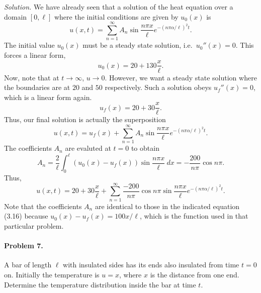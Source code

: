 \documentclass[10pt]{article}
\begin{document}
        \textit{Solution.} We have already seen that a solution of the heat equation over a domain $[0, \ell]$ where the initial conditions
        are given by $u_0(x)$ is
        \[
                u(x, t) = \sum_{n = 1}^\infty A_n \sin\frac{n\pi x}{\ell} e^{-(n\pi \alpha /\ell)^2 t}.
        \]
        The initial value $u_0(x)$ must be a steady state solution, i.e.\ $u_0''(x) = 0$. This forces a linear form,
        \[
                u_0(x) = 20 + 130\frac{x}{\ell}.
        \]
        Now, note that at $t \to \infty$, $u \to 0$. However, we want a steady state solution where the boundaries are at $20$ and $50$ respectively.
        Such a solution obeys $u_f''(x) = 0$, which is a linear form again.
        \[
                u_f(x) = 20 + 30\frac{x}{\ell}.
        \]
        Thus, our final solution is actually the superposition
        \[
                u(x, t) = u_f(x) + \sum_{n = 1}^\infty A_n \sin\frac{n\pi x}{\ell} e^{-(n\pi \alpha /\ell)^2 t}.
        \]
        The coefficients $A_n$ are evaluted at $t = 0$ to obtain
        \[
                A_n = \frac{2}{\ell} \int_0^\ell (u_0(x) - u_f(x))\sin\frac{n\pi x}{\ell}\:dx = -\frac{200}{n\pi}\cos{n\pi}.
        \]
        Thus, 
        \[
                u(x, t) = 20 + 30\frac{x}{\ell} + \sum_{n = 1}^\infty \frac{-200}{n\pi}\cos{n\pi}\sin\frac{n\pi x}{\ell} e^{-(n\pi \alpha /\ell)^2 t}.
        \]
        Note that the coefficients $A_n$ are identical to those in the indicated equation (3.16) because $u_0(x) - u_f(x) = 100x/\ell$, which 
        is the function used in that particular problem.

        \paragraph{Problem 7.} A bar of length $\ell$ with insulated sides has its ends also insulated from time $t = 0$ on.
        Initially the temperature is $u = x$, where $x$ is the distance from one end. Determine the temperature distribution inside the bar at time $t$. \\
\end{document}
